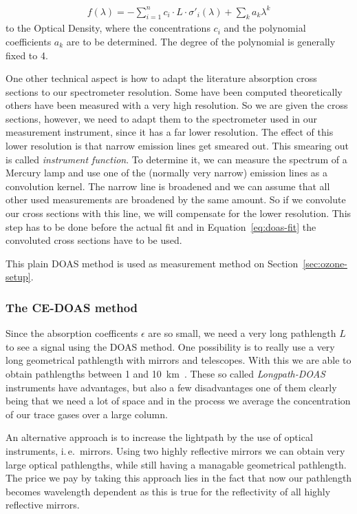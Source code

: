 \begin{align}
  f(\lambda) = - \sum_{i=1}^n c_i \cdot L \cdot \sigma'_i(\lambda) +
  \sum_k a_k \lambda^k \label{eq:doas-fit}
\end{align}
to the Optical Density, where the concentrations $c_i$ and the polynomial
coefficients $a_k$ are to be determined. The degree of the polynomial
is generally fixed to \num{4}.

One other technical aspect is how to adapt the literature
absorption cross sections to our spectrometer resolution. Some have
been computed theoretically others have been 
measured with a very high resolution. So we are given the
cross sections, however, we need to adapt them to the spectrometer used
in our measurement instrument, since it has a far lower
resolution. The effect of this lower resolution is that narrow
emission lines get smeared out. This smearing out is called
\emph{instrument function}. To determine it, we can measure the
spectrum of a Mercury lamp and use one of the
(normally very narrow) emission lines as a convolution kernel. The
narrow line is broadened and we can assume that all other used
measurements are broadened by the same amount. So if we convolute our
cross sections with this  line, we will compensate for
the lower resolution. This step has to be done before the actual fit
and in Equation~\eqref{eq:doas-fit} the convoluted cross sections have
to be used.

This plain DOAS method is used as measurement method on
Section~\ref{sec:ozone-setup}. 

\subsubsection{The CE-DOAS method}
\label{sec:ce-doas}

Since the absorption coefficents $\epsilon$ are so small, we need a
very long pathlength $L$ to see a signal using the DOAS method. One
possibility is to really use a very long geometrical pathlength with
mirrors and telescopes. With this we are able to obtain pathlengths
between \num{1} and \SI{10}{\kilo\meter}~\cite{platt}. These so called
\emph{Longpath-DOAS} instruments have advantages, but also a few
disadvantages one of them clearly being that we need a lot of space
and in the process we average the concentration of our trace gases
over a large column.

An alternative approach is to increase the lightpath by the use of
optical instruments, i.\,e.\ mirrors. Using two highly reflective
mirrors we can obtain very large optical pathlengths, while still
having a managable geometrical pathlength. The price we pay by taking
this approach lies in the fact that now our pathlength becomes
wavelength dependent as this is true for the reflectivity of all
highly reflective mirrors. 

